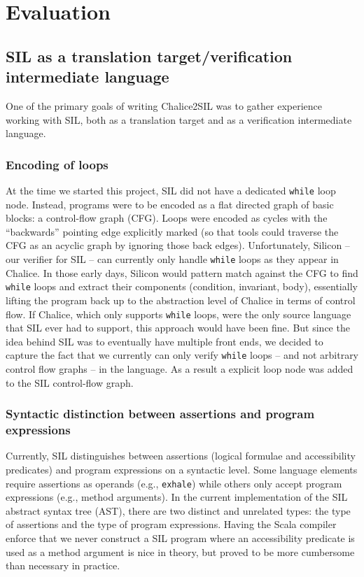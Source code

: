
\section{Evaluation}\label{sct:eval}

\subsection{SIL as a translation target/verification intermediate language}
One of the primary goals of writing Chalice2SIL was to gather experience working with SIL, both as a translation target and as a verification intermediate language. 

\subsubsection{Encoding of loops}
At the time we started this project, SIL did not have a dedicated \lstinline[language=Chalice]!while! loop node. 
Instead, programs were to be encoded as a flat directed graph of basic blocks: a control-flow graph (CFG).
Loops were encoded as cycles with the ``backwards'' pointing edge explicitly marked (so that tools could traverse the CFG as an acyclic graph by ignoring those back edges).
Unfortunately, Silicon -- our verifier for SIL -- can currently only handle \lstinline[language=Chalice]!while! loops as they appear in Chalice. 
In those early days, Silicon would pattern match against the CFG to find \lstinline[language=Chalice]!while! loops and extract their components (condition, invariant, body), essentially lifting the program back up to the abstraction level of Chalice in terms of control flow.
If Chalice, which only supports \lstinline[language=Chalice]!while! loops, were the only source language that SIL ever had to support, this approach would have been fine.
But since the idea behind SIL was to eventually have multiple front ends, we decided to capture the fact that we currently can only verify \lstinline[language=Chalice]!while! loops -- and not arbitrary control flow graphs -- in the language.
As a result a explicit loop node was added to the SIL control-flow graph.

\subsubsection{Syntactic distinction between assertions and program expressions}
Currently, SIL distinguishes between assertions (logical formulae and accessibility predicates) and program expressions on a syntactic level. 
Some language elements require assertions as operands (e.g., \lstinline[language=SIL]!exhale!) while others only accept program expressions (e.g., method arguments).
In the current implementation of the SIL abstract syntax tree (AST), there are two distinct and unrelated types: the type of assertions and the type of program expressions.
Having the Scala compiler enforce that we never construct a SIL program where an accessibility predicate is used as a method argument is nice in theory, but proved to be more cumbersome than necessary in practice.

